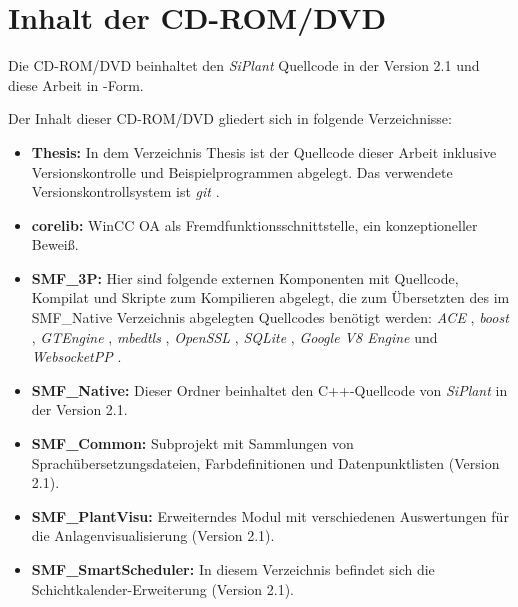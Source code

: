 \chapter{Inhalt der CD-ROM/DVD}
\label{app:cdrom}

Die CD-ROM/DVD beinhaltet den \textit{SiPlant} Quellcode in der Version 2.1 und diese Arbeit in \textit{\latex}-Form. 
\newline
\par
Der Inhalt dieser CD-ROM/DVD gliedert sich in folgende Verzeichnisse:
\begin{itemize}
\item \textbf{Thesis:} In dem Verzeichnis Thesis ist der \textit{\latex} Quellcode dieser Arbeit inklusive Versionskontrolle und Beispielprogrammen abgelegt. Das verwendete Versionskontrollsystem ist \textit{git} \cite{git}.
\item \textbf{corelib:} WinCC OA als Fremdfunktionsschnittstelle, ein konzeptioneller Beweiß.
\item \textbf{SMF\_3P:} Hier sind folgende externen Komponenten mit Quellcode, Kompilat und Skripte zum Kompilieren abgelegt, die zum Übersetzten des im SMF\_Native Verzeichnis abgelegten Quellcodes benötigt werden: \textit{ACE} \cite{ACE}, \textit{boost} \cite{boost}, \textit{GTEngine} \cite{GTEngine}, \textit{mbedtls} \cite{mbedtls}, \textit{OpenSSL} \cite{OpenSSL}, \textit{SQLite} \cite{SQlite}, \textit{Google V8 Engine} \cite{v8engine} und \textit{WebsocketPP} \cite{websocketpp}.
\item \textbf{SMF\_Native:} Dieser Ordner beinhaltet den C++-Quellcode von \textit{SiPlant} in der Version 2.1.
\item \textbf{SMF\_Common:} Subprojekt mit Sammlungen von Sprachübersetzungsdateien, Farbdefinitionen und Datenpunktlisten (Version 2.1).
\item \textbf{SMF\_PlantVisu:} Erweiterndes Modul mit verschiedenen Auswertungen für die Anlagenvisualisierung (Version 2.1).
\item \textbf{SMF\_SmartScheduler:} In diesem Verzeichnis befindet sich die Schichtkalender-Erweiterung (Version 2.1).
\end{itemize}
